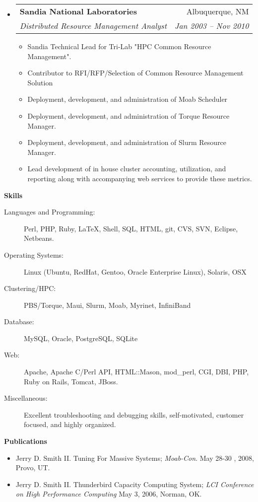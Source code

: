 \documentclass[letterpaper,10pt]{article}
\makeatletter
\newcommand{\resitem}[1]{\item #1 \vspace{-2pt}}
\newcommand{\resheading}[1]{{\large{\colorbox{MyGrey}{\textbf{\fontfamily{phv}\selectfont #1 \vphantom{p\^{E}}}}}}}
\newcommand{\ressubheading}[4]{
\begin{tabular*}{6.5in}{l@{\extracolsep{\fill}}r}
		\textbf{#1} & #2 \\
		\textit{#3} & \textit{#4} \\
\end{tabular*}\vspace{-6pt}}
\makeatother
\begin{document}
\begin{itemize}
\item
    \ressubheading{Sandia National Laboratories}{Albuquerque, NM}{Distributed Resource Management Analyst}{Jan 2003 -- Nov 2010}
    \begin{itemize}
       \resitem{Sandia Technical Lead for Tri-Lab "HPC Common Resource Management".}
       \resitem{Contributor to RFI/RFP/Selection of Common Resource Management Solution}
       \resitem{Deployment, development, and administration of Moab Scheduler}
       \resitem{Deployment, development, and administration of Torque Resource Manager.}
       \resitem{Deployment, development, and administration of Slurm Resource Manager.}
       \resitem{Lead development of in house cluster accounting, utilization, and reporting along with accompanying web services to provide these metrics.}
    \end{itemize}



\end{itemize}

\resheading{Skills}
\begin{description}
\item[Languages and Programming:]  Perl, PHP, Ruby,  \LaTeX, Shell, SQL,  HTML, git, CVS, SVN, Eclipse, Netbeans.
\item[Operating Systems:] Linux (Ubuntu, RedHat, Gentoo, Oracle Enterprise Linux), Solaris, OSX
\item[Clustering/HPC:] PBS/Torque, Maui, Slurm, Moab, Myrinet, InfiniBand
\item[Database:] MySQL, Oracle, PostgreSQL, SQLite
\item[Web:] Apache, Apache C/Perl API, HTML::Mason, mod\_perl, CGI, DBI, PHP, Ruby on Rails, Tomcat, JBoss.
\item[Miscellaneous:] Excellent troubleshooting and debugging skills, self-motivated, customer focused, and highly organized.
\end{description}

\resheading{Publications}
\begin{itemize}
    \item Jerry D. Smith II.  Tuning For Massive Systems; {\sl Moab-Con}.  May 28-30 , 2008, Provo, UT.
    \item Jerry D. Smith II.  Thunderbird Capacity Computing System; {\sl LCI Conference on High Performance Computing} May 3, 2006,  Norman, OK.
\end{itemize}
\end{document}
